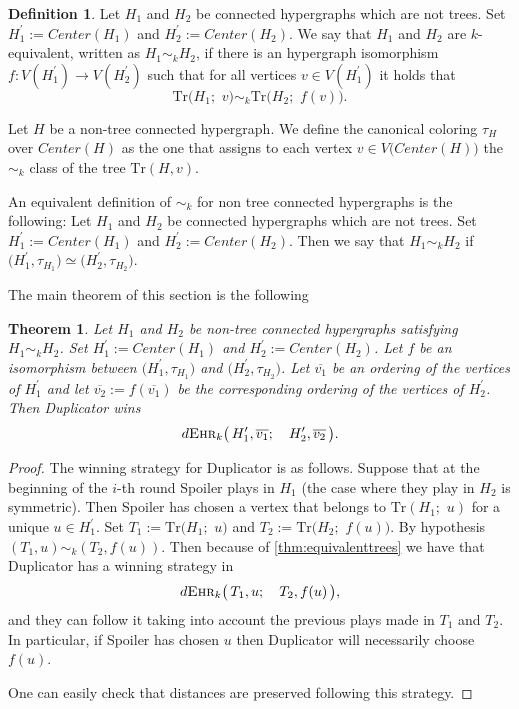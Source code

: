 \documentclass[12pt,notitlepage,a4paper]{article}
\newtheorem{theorem}{Theorem}[section]
\theoremstyle{definition}
\newtheorem{definition}{Definition}[section]
\newcommand{\ehr}{\textsc{Ehr}}
\begin{document}
\begin{definition}
	Let $H_1$ and $H_2$ be connected hypergraphs which are not trees.
	Set $H^\prime_1:= Center(H_1)$ and $H^\prime_2:= Center(H_2)$.
	We say that $H_1$ and $H_2$ are $k$-equivalent,
	written as $H_1\sim_k H_2$, if there is an hypergraph isomorphism
	$f:V(H^\prime_1)\rightarrow V(H^\prime_2)$ such that for all vertices
	$v\in V(H^\prime_1)$ it holds that
	\[
	\mathrm{Tr}\big(H_1;\,\, v\big)\sim_k 
	\mathrm{Tr}\big(H_2;\,\, f(v)\big).
	\] 
\end{definition}
	Let $H$ be a non-tree connected hypergraph. We define
	the canonical coloring $\tau_{H}$ over $Center(H)$
	as the one that assigns to each vertex $v\in V\big(
	Center(H)\big)$ the $\sim_k$ class of the tree
	$\mathrm{Tr}(H,v)$.\par
	An equivalent definition of $\sim_k$ for non tree connected
	hypergraphs is the following: 
	Let $H_1$ and $H_2$ be connected hypergraphs which are not trees.
	Set $H^\prime_1:= Center(H_1)$ and $H^\prime_2:= Center(H_2)$.
	Then we say that $H_1\sim_k H_2$ if
	$\big( H^\prime_1,\tau_{H_1}\big) \simeq 
	\big(H^\prime_2,\tau_{H_2}\big)$.\par
	The main theorem of this section is the following
	
	\begin{theorem}
		Let $H_1$ and $H_2$ be non-tree 
		connected hypergraphs satisfying
		$H_1\sim_k H_2$. 
		Set $H^\prime_1:= Center(H_1)$ and 
		$H^\prime_2:= Center(H_2)$. Let $f$ be an isomorphism
		between $\big( H^\prime_1,\tau_{H_1}\big)$ and 
		$\big(H^\prime_2,\tau_{H_2}\big)$. Let $\overline{v_1}$ 
		be an ordering of the vertices of $H^\prime_1$ and let
		$\overline{v_2}:=f(\overline{v_1})$ be the corresponding
		ordering of the vertices of $H^\prime_2$. Then
		Duplicator wins 
		\[	d\ehr_{k}\big(\,
		H^\prime_1,\overline{v_1};\quad
		H^\prime_2,\overline{v_2}\,
		\big).
		\]
	\end{theorem}
	\begin{proof}
		The winning strategy for Duplicator is as follows. 
		Suppose that at the beginning of the $i$-th round
		Spoiler plays in $H_1$ (the case where they play in
		$H_2$ is symmetric). Then Spoiler has chosen a vertex 
		that belongs to $\mathrm{Tr}(H_1;\,\,u)$ for a unique
		$u\in H^\prime_1$. 
		Set $T_1:=\mathrm{Tr}\big(H_1;\,\,u\big)$ and
		$T_2:=\mathrm{Tr}\big(H_2;\,\,f(u)\big)$.
		By hypothesis
		$(T_1,u)\sim_k (T_2,f(u))$. 
		Then because of \cref{thm:equivalenttrees} we have that
		Duplicator has a winning strategy in
		\[
		d\ehr_{k}\big(\,
		T_1,u; \quad T_2, f(u)\,\big),
		\]
		and they can follow it taking into account the previous
		plays made in $T_1$ and $T_2$. In particular, 
		if Spoiler has chosen
		$u$ then Duplicator will necessarily choose $f(u)$.\par
		One can easily check that distances are preserved
		following this strategy. 
	\end{proof}
		
\end{document}
